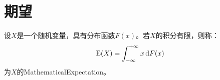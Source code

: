 \section{期望}

\begin{definition}
	设$X$是一个随机变量，具有分布函数$F(x)$。若$X$的积分有限，则称：
	\begin{equation*}
		\operatorname{E}(X)=\int_{-\infty}^{+\infty}x\mathop{}\!\mathrm{d} F(x)
	\end{equation*}
	为$X$的\gls{MathematicalExpectation}。
\end{definition}
